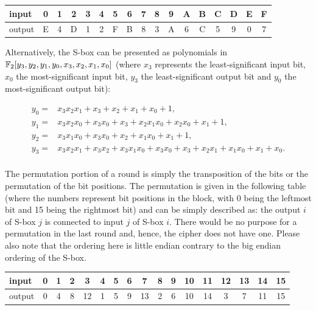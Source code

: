\begin{center}
\begin{tabular}{|l |c|c|c|c| c|c|c|c| c|c|c|c| c|c|c|c|}
\hline
input  & 0 & 1 & 2 & 3 & 4 & 5 & 6 & 7 & 8 & 9 & A & B & C & D & E & F\\
\hline
output & E & 4 & D & 1 & 2 & F & B & 8 & 3 & A & 6 & C & 5 & 9 & 0 & 7\\
\hline
\end{tabular}
\end{center}

Alternatively, the S-box can be presented as polynomials in $\mathbb{F}_{2}[y_{3}, y_{2}, y_{1}, y_{0}, x_{3}, x_{2}, x_{1},
x_{0}]$ (where $x_3$ represents the least-significant input bit, $x_0$ the most-significant input bit, $y_3$ the
least-significant output bit and $y_0$ the most-significant output bit):

\begin{align*}
y_{0} =& x_{3}x_{2}x_{1} + x_{3} + x_{2} + x_{1} + x_{0} + 1,\\
y_{1} =& x_{3}x_{2}x_{0} + x_{3}x_{0} + x_{3} + x_{2}x_{1}x_{0} + x_{2}x_{0} + x_{1} + 1,\\
y_{2} =& x_{3}x_{1}x_{0} + x_{3}x_{0} + x_{2} + x_{1}x_{0} + x_{1} + 1,\\
y_{3} =& x_{3}x_{2}x_{1} + x_{3}x_{2} + x_{3}x_{1}x_{0} + x_{3}x_{0} + x_{3} + x_{2}x_{1} + x_{1}x_{0} + x_{1} + x_{0}.\\
\end{align*}

The permutation portion of a round is simply the transposition of the bits or the permutation of the bit positions. The permutation is given in the following table (where the numbers represent bit positions in the block, with 0 being the leftmost bit and 15 being the rightmost bit) and can be simply described as: the output $i$ of S-box $j$ is connected to input $j$ of S-box $i$. There would be no purpose for a permutation in the last round and, hence, the cipher does not have one. Please also note that the ordering here is little endian contrary to the big endian ordering of the S-box.

\begin{center}
\begin{tabular}{|l |c|c|c|c| c|c|c|c| c|c|c|c| c|c|c|c|}
\hline
  input  & 0 & 1 & 2 &  3 & 4 & 5 & 6 &  7 & 8 & 9 & 10 & 11 & 12 & 13 & 14 & 15 \\
\hline
output & 0 & 4 & 8 & 12 & 1 & 5 & 9 & 13 & 2 & 6 & 10 & 14 &  3 &  7 & 11 & 15 \\
\hline
\end{tabular}
\end{center}

